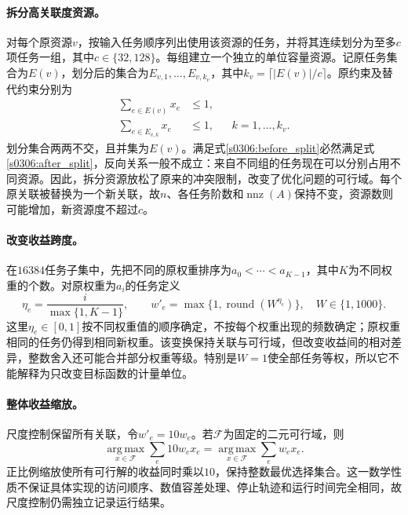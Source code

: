 \paragraph{拆分高关联度资源。}
对每个原资源$v$，按输入任务顺序列出使用该资源的任务，并将其连续划分为至多$c$项任务一组，其中$c\in\{32,128\}$。每组建立一个独立的单位容量资源。记原任务集合为$E(v)$，划分后的集合为$E_{v,1},\ldots,E_{v,k_v}$，其中$k_v=\lceil|E(v)|/c\rceil$。原约束及替代约束分别为
\begin{align}
 \sum_{e\in E(v)}x_e&\leq1,
 \label{s0306:before_split}\\
 \sum_{e\in E_{v,k}}x_e&\leq1,
 &&k=1,\ldots,k_v.
 \label{s0306:after_split}
\end{align}
划分集合两两不交，且并集为$E(v)$。满足式\eqref{s0306:before_split}必然满足式\eqref{s0306:after_split}，反向关系一般不成立：来自不同组的任务现在可以分别占用不同资源。因此，拆分资源放松了原来的冲突限制，改变了优化问题的可行域。每个原关联被替换为一个新关联，故$n$、各任务阶数和$\operatorname{nnz}(A)$保持不变，资源数则可能增加，新资源度不超过$c$。

\paragraph{改变收益跨度。}
在$16384$任务子集中，先把不同的原权重排序为$a_0<\cdots<a_{K-1}$，其中$K$为不同权重的个数。对原权重为$a_i$的任务定义
\begin{equation}
 \eta_e=\frac{i}{\max\{1,K-1\}},\qquad
 w'_e=\max\{1,\operatorname{round}(W^{\eta_e})\},
 \quad W\in\{1,1000\}.
 \label{s0306:public_spread}
\end{equation}
这里$\eta_e\in[0,1]$按不同权重值的顺序确定，不按每个权重出现的频数确定；原权重相同的任务仍得到相同新权重。该变换保持关联与可行域，但改变收益间的相对差异，整数舍入还可能合并部分权重等级。特别是$W=1$使全部任务等权，所以它不能解释为只改变目标函数的计量单位。

\paragraph{整体收益缩放。}
尺度控制保留所有关联，令$w'_e=10w_e$。若$\mathcal F$为固定的二元可行域，则
\begin{equation}
 \underset{x\in\mathcal F}{\operatorname{arg\,max}}
 \sum_e10w_ex_e
 =
 \underset{x\in\mathcal F}{\operatorname{arg\,max}}
 \sum_ew_ex_e.
 \label{s0306:scale_invariance}
\end{equation}
正比例缩放使所有可行解的收益同时乘以$10$，保持整数最优选择集合。这一数学性质不保证具体实现的访问顺序、数值容差处理、停止轨迹和运行时间完全相同，故尺度控制仍需独立记录运行结果。

